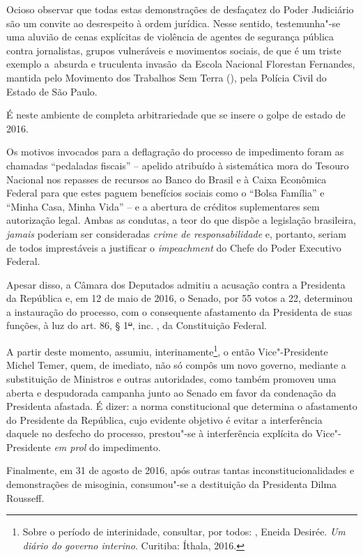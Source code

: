 Ocioso observar que todas estas demonstrações de desfaçatez do Poder
Judiciário são um convite ao desrespeito à ordem jurídica. Nesse
sentido, testemunha"-se uma aluvião de cenas explícitas de violência de
agentes de segurança pública contra jornalistas, grupos vulneráveis e
movimentos sociais, de que é um triste exemplo a~absurda e truculenta
invasão~da Escola Nacional Florestan Fernandes, mantida pelo Movimento
dos Trabalhos Sem Terra (), pela Polícia Civil do Estado de São
Paulo.

É neste ambiente de completa arbitrariedade que se insere o golpe de
estado de 2016.

Os motivos invocados para a deflagração do processo de impedimento foram
as chamadas ``pedaladas fiscais'' -- apelido atribuído à sistemática
mora do Tesouro Nacional nos repasses de recursos ao Banco do Brasil e à
Caixa Econômica Federal para que estes paguem benefícios sociais como o
``Bolsa Família'' e ``Minha Casa, Minha Vida'' -- e a abertura de
créditos suplementares sem autorização legal. Ambas as condutas, a teor
do que dispõe a legislação brasileira, \emph{jamais} poderiam ser
consideradas \emph{crime de responsabilidade} e, portanto, seriam de
todos imprestáveis a justificar o \emph{impeachment} do Chefe do Poder
Executivo Federal.

Apesar disso, a Câmara dos Deputados admitiu a acusação contra a
Presidenta da República e, em 12 de maio de 2016, o Senado, por 55 votos
a 22, determinou a instauração do processo, com o consequente
afastamento da Presidenta de suas funções, à luz do art. 86, §
1\sout{º}, inc. , da Constituição Federal.

A partir deste momento, assumiu, interinamente\footnote{Sobre o período
  de interinidade, consultar, por todos: , Eneida Desirée.
  \emph{Um diário do governo interino}. Curitiba: Íthala, 2016.}, o
então Vice"-Presidente Michel Temer, quem, de imediato, não só compôs um
novo governo, mediante a substituição de Ministros e outras autoridades,
como também promoveu uma aberta e despudorada campanha junto ao Senado
em favor da condenação da Presidenta afastada. É dizer: a norma
constitucional que determina o afastamento do Presidente da República,
cujo evidente objetivo é evitar a interferência daquele no desfecho do
processo, prestou"-se à interferência explícita do Vice"-Presidente
\emph{em prol} do impedimento.

Finalmente, em 31 de agosto de 2016, após outras tantas
inconstitucionalidades e demonstrações de misoginia, consumou"-se a
destituição da Presidenta Dilma Rousseff.

